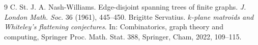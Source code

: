 \documentclass[10pt,a4paper]{article}
\begin{document}
\begin{thebibliography}{9}
 C. St. J. A. Nash-Williams. Edge-disjoint spanning trees of finite graphs. \emph{J. London Math. Soc.} 36 (1961), 445--450.
 Brigitte Servatius. \emph{$k$-plane matroids and Whiteley's flattening conjectures}. In: Combinatorics, graph theory and computing, Springer Proc. Math. Stat. 388, Springer, Cham, 2022, 109--115.
\end{thebibliography}
\end{document}
